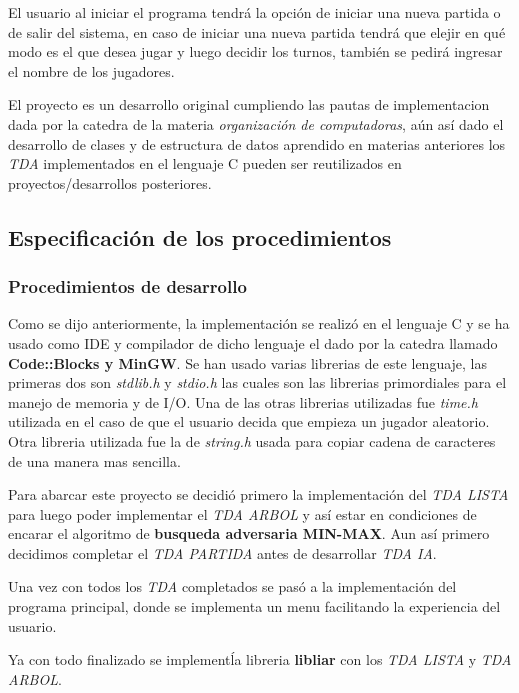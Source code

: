 \documentclass[12pt,a4paper]{article}
\begin{document}
    El usuario al iniciar el programa tendr\'a la opci\'on de iniciar una nueva partida o de salir del sistema, en caso de iniciar una nueva partida tendr\'a que elejir en qu\'e modo es el que desea jugar y luego decidir los turnos, tambi\'en se pedir\'a ingresar el nombre de los jugadores.

    El proyecto es un desarrollo original cumpliendo las pautas de implementacion dada por la catedra de la materia {\itshape organizaci\'on de computadoras}, a\'un as\'i dado el desarrollo de clases y de estructura de datos aprendido en materias anteriores los {\itshape TDA} implementados en el lenguaje C pueden ser reutilizados en proyectos/desarrollos posteriores.

\subsection{Especificaci\'on de los procedimientos}

\subsubsection{Procedimientos de desarrollo}
    Como se dijo anteriormente, la implementaci\'on se realiz\'o en el lenguaje C y se ha usado como IDE y compilador de dicho lenguaje el dado por la catedra llamado {\bf Code::Blocks y MinGW}. Se han usado varias librerias de este lenguaje, las primeras dos son {\itshape stdlib.h} y {\itshape stdio.h} las cuales son las librerias primordiales para el manejo de memoria y de I/O. Una de las otras librerias utilizadas fue {\itshape time.h} utilizada en el caso de que el usuario decida que empieza un jugador aleatorio. Otra libreria utilizada fue la de {\itshape string.h} usada para copiar cadena de caracteres de una manera mas sencilla.

    Para abarcar este proyecto se decidi\'o primero la implementaci\'on del {\itshape TDA LISTA} para luego poder implementar el {\itshape TDA ARBOL} y as\'i estar en condiciones de encarar el algoritmo de {\bf busqueda adversaria MIN-MAX}. Aun as\'i primero decidimos completar el {\itshape TDA PARTIDA} antes de desarrollar {\itshape TDA IA}.

    Una vez con todos los {\itshape TDA} completados se pas\'o a la implementaci\'on del programa principal, donde se implementa un menu facilitando la experiencia del usuario.

    Ya con todo finalizado se implement\' la libreria {\bf libliar} con los {\itshape TDA LISTA} y {\itshape TDA ARBOL}.
\end{document}
